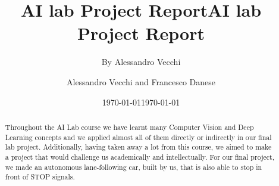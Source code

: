 \documentclass[12pt,a4paper]{article}
\title{AI lab Project Report}
\date{\today}
\author{By Alessandro Vecchi}
\begin{document}
\title{\textbf{AI lab Project Report}}
\author{Alessandro Vecchi and Francesco Danese}
\date{\today}
\maketitle


\begin{abstract}

\begin{addmargin}[3em]{1em}
\centering
Throughout the AI Lab course we have learnt many Computer Vision and Deep Learning concepts and we applied almost all of them directly or indirectly in our final lab project. Additionally, having taken away a lot from this course, we aimed to make a project that would challenge us academically and intellectually. For our final project, we made an autonomous lane-following car, built by us, that is also able to stop in front of STOP signals.
\end{addmargin}

\end{abstract}
\end{document}
